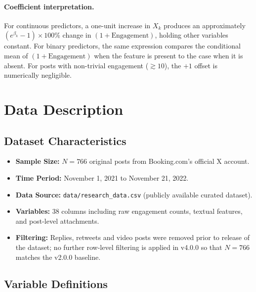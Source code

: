 \documentclass[12pt,a4paper]{article}
\begin{document}
\paragraph{Coefficient interpretation.} For continuous predictors, a one-unit increase in $X_k$ produces an approximately $(e^{\beta_k}-1)\times 100\%$ change in $(1+\text{Engagement})$, holding other variables constant. For binary predictors, the same expression compares the conditional mean of $(1+\text{Engagement})$ when the feature is present to the case when it is absent. For posts with non-trivial engagement ($\gtrsim 10$), the $+1$ offset is numerically negligible.

\section{Data Description}

\subsection{Dataset Characteristics}

\begin{itemize}
    \item \textbf{Sample Size:} $N = 766$ original posts from Booking.com's official X account.
    \item \textbf{Time Period:} November 1, 2021 to November 21, 2022.
    \item \textbf{Data Source:} \texttt{data/research\_data.csv} (publicly available curated dataset).
    \item \textbf{Variables:} 38 columns including raw engagement counts, textual features, and post-level attachments.
    \item \textbf{Filtering:} Replies, retweets and video posts were removed prior to release of the dataset; no further row-level filtering is applied in v4.0.0 so that $N=766$ matches the v2.0.0 baseline.
\end{itemize}

\subsection{Variable Definitions}
\end{document}
